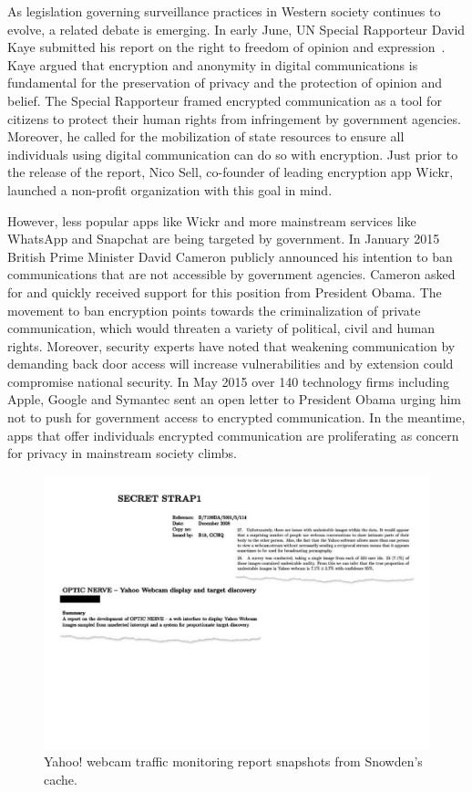 \documentclass{llncs}
\begin{document}
As legislation governing surveillance practices in Western society continues to evolve, a related debate is emerging. In early June, UN Special Rapporteur David Kaye submitted his report on the right to freedom of opinion and expression~\cite{Kaye}. Kaye argued that encryption and anonymity in digital communications is fundamental for the preservation of privacy and the protection of opinion and belief. The Special Rapporteur framed encrypted communication as a tool for citizens to protect their human rights from infringement by government agencies. Moreover, he called for the mobilization of state resources to ensure all individuals using digital communication can do so with encryption. Just prior to the release of the report, Nico Sell, co-founder of leading encryption app Wickr, launched a non-profit organization with this goal in mind. 

However, less popular apps like Wickr and more mainstream services like WhatsApp and Snapchat are being targeted by government. In January 2015 British Prime Minister David Cameron publicly announced his intention to ban communications that are not accessible by government agencies. Cameron asked for and quickly received support for this position from President Obama. The movement to ban encryption points towards the criminalization of private communication, which would threaten a variety of political, civil and human rights. Moreover, security experts have noted that weakening communication by demanding back door access will increase vulnerabilities and by extension could compromise national security. In May 2015 over 140 technology firms including Apple, Google and Symantec sent an open letter to President Obama urging him not to push for government access to encrypted communication. In the meantime, apps that offer individuals encrypted communication are proliferating as concern for privacy in mainstream society climbs.

\begin{figure}
\begin{center}
\includegraphics[scale=0.4]{fig1}
\caption{Yahoo! webcam traffic monitoring report snapshots from Snowden's cache.}
\label{fig:Yahoo}
\end{center}
\end{figure}
\end{document}
